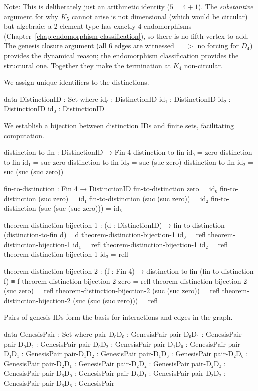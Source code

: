 \documentclass[11pt,a4paper]{book}
\def\Rightarrow{=>}%
\begin{document}
\noindent Note: This is deliberately just an arithmetic identity ($5 = 4 + 1$).
The \emph{substantive} argument for why $K_5$ cannot arise is not dimensional
(which would be circular) but algebraic: a 2-element type has exactly 4
endomorphisms (Chapter~\ref{chap:endomorphism-classification}), so there is no
fifth vertex to add.  The genesis closure argument (all 6 edges are
witnessed $\Rightarrow$ no forcing for $D_4$) provides the dynamical reason;
the endomorphism classification provides the structural one.  Together they
make the termination at $K_4$ non-circular.

We assign unique identifiers to the distinctions.

\begin{code}
data DistinctionID : Set where
  id₀ : DistinctionID
  id₁ : DistinctionID
  id₂ : DistinctionID
  id₃ : DistinctionID

\end{code}

We establish a bijection between distinction IDs and finite sets, facilitating computation.

\begin{code}
distinction-to-fin : DistinctionID → Fin 4
distinction-to-fin id₀ = zero
distinction-to-fin id₁ = suc zero
distinction-to-fin id₂ = suc (suc zero)
distinction-to-fin id₃ = suc (suc (suc zero))

fin-to-distinction : Fin 4 → DistinctionID
fin-to-distinction zero = id₀
fin-to-distinction (suc zero) = id₁
fin-to-distinction (suc (suc zero)) = id₂
fin-to-distinction (suc (suc (suc zero))) = id₃

theorem-distinction-bijection-1 : (d : DistinctionID) → fin-to-distinction (distinction-to-fin d) ≡ d
theorem-distinction-bijection-1 id₀ = refl
theorem-distinction-bijection-1 id₁ = refl
theorem-distinction-bijection-1 id₂ = refl
theorem-distinction-bijection-1 id₃ = refl

theorem-distinction-bijection-2 : (f : Fin 4) → distinction-to-fin (fin-to-distinction f) ≡ f
theorem-distinction-bijection-2 zero = refl
theorem-distinction-bijection-2 (suc zero) = refl
theorem-distinction-bijection-2 (suc (suc zero)) = refl
theorem-distinction-bijection-2 (suc (suc (suc zero))) = refl
\end{code}

Pairs of genesis IDs form the basis for interactions and edges in the graph.

\begin{code}
data GenesisPair : Set where
  pair-D₀D₀ : GenesisPair
  pair-D₀D₁ : GenesisPair
  pair-D₀D₂ : GenesisPair
  pair-D₀D₃ : GenesisPair
  pair-D₁D₀ : GenesisPair
  pair-D₁D₁ : GenesisPair
  pair-D₁D₂ : GenesisPair
  pair-D₁D₃ : GenesisPair
  pair-D₂D₀ : GenesisPair
  pair-D₂D₁ : GenesisPair
  pair-D₂D₂ : GenesisPair
  pair-D₂D₃ : GenesisPair
  pair-D₃D₀ : GenesisPair
  pair-D₃D₁ : GenesisPair
  pair-D₃D₂ : GenesisPair
  pair-D₃D₃ : GenesisPair
\end{code}
\end{document}
